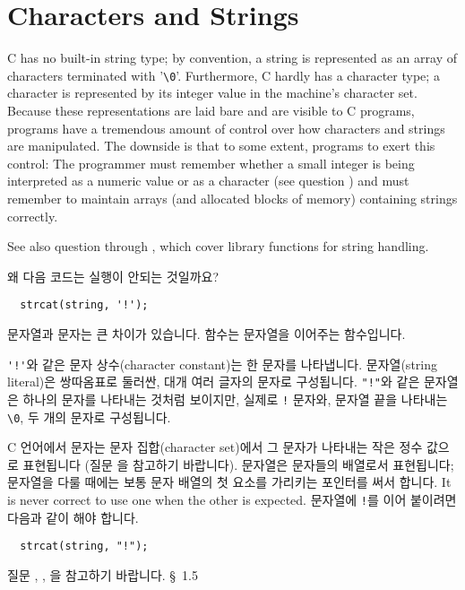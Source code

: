 \chapter{Characters and Strings}	\label{chap:charstr}

C has no built-in string type; by convention, a string is represented as an
array of characters terminated with '\verb+\0+'.  Furthermore, C hardly has
a character type; a character is represented by its integer value in the
machine's character set.  Because these representations are laid bare and are
visible to C programs, programs have a tremendous amount of control over how
characters and strings are manipulated.  The downside is that to some extent,
programs  to exert this control:  The programmer must remember
whether a small integer is being interpreted as a numeric value or as a
character (see question ) and must remember to maintain arrays (and
allocated blocks of memory) containing strings correctly.

See also question  through , which cover library functions for
string handling.

\begin{faq}
	왜 다음 코드는 실행이 안되는 것일까요?
\begin{verbatim}
  strcat(string, '!');
\end{verbatim}
\A	
	문자열과 문자는 큰 차이가 있습니다.   함수는 문자열을
	이어주는 함수입니다.
        
        \verb+'!'+와 같은 문자 상수(character constant)는 한 문자를 나타냅니다.
        문자열(string literal)은 쌍따옴표로 둘러싼, 대개 여러 글자의 문자로
        구성됩니다. \verb+"!"+와 같은 문자열은 하나의 문자를 나타내는 것처럼
        보이지만, 실제로 \verb+!+ 문자와, 문자열 끝을 나타내는 \verb+\0+, 두
        개의 문자로 구성됩니다.

	C 언어에서 문자는 문자 집합(character set)에서 그 문자가 나타내는
	작은 정수 값으로 표현됩니다 (질문 을 참고하기 바랍니다).
	문자열은 문자들의 배열로서 표현됩니다; 문자열을 다룰 때에는
	보통 문자 배열의 첫 요소를 가리키는 포인터를 써서 합니다.
        It is never correct to use one when the other is expected.
	문자열에 \verb+!+를 이어 붙이려면 다음과 같이 해야 합니다.
\begin{verbatim}
  strcat(string, "!");
\end{verbatim}

	질문 , , 을 참고하기 바랍니다.
\R
	\cite{ctp} \S\ 1.5 
\end{faq}

